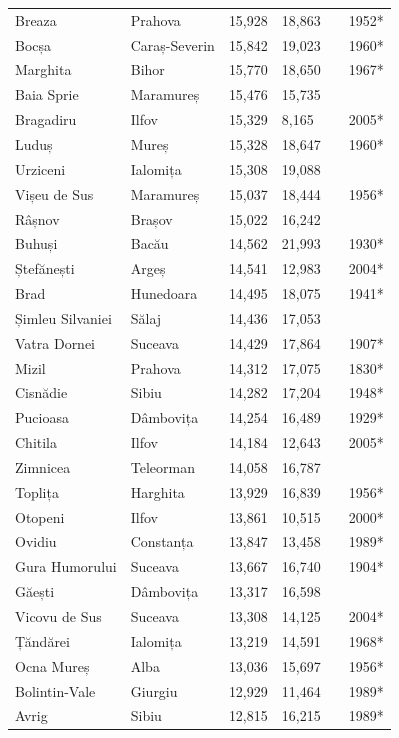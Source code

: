 \documentclass{article}
\begin{document}
\begin{tabular}{llllll}
Breaza & Prahova & 15,928 & 18,863 &  & 1952* \\
Bocșa & Caraș-Severin & 15,842 & 19,023 &  & 1960* \\
Marghita & Bihor & 15,770 & 18,650 &  & 1967* \\
Baia Sprie & Maramureș & 15,476 & 15,735 &  &  \\
Bragadiru & Ilfov & 15,329 & 8,165 &  & 2005* \\
Luduș & Mureș & 15,328 & 18,647 &  & 1960* \\
Urziceni & Ialomița & 15,308 & 19,088 &  &  \\
Vișeu de Sus & Maramureș & 15,037 & 18,444 &  & 1956* \\
Râșnov & Brașov & 15,022 & 16,242 &  &  \\
Buhuși & Bacău & 14,562 & 21,993 &  & 1930* \\
Ștefănești & Argeș & 14,541 & 12,983 &  & 2004* \\
Brad & Hunedoara & 14,495 & 18,075 &  & 1941* \\
Șimleu Silvaniei & Sălaj & 14,436 & 17,053 &  &  \\
Vatra Dornei & Suceava & 14,429 & 17,864 &  & 1907* \\
Mizil & Prahova & 14,312 & 17,075 &  & 1830* \\
Cisnădie & Sibiu & 14,282 & 17,204 &  & 1948* \\
Pucioasa & Dâmbovița & 14,254 & 16,489 &  & 1929* \\
Chitila & Ilfov & 14,184 & 12,643 &  & 2005* \\
Zimnicea & Teleorman & 14,058 & 16,787 &  &  \\
Toplița & Harghita & 13,929 & 16,839 &  & 1956* \\
Otopeni & Ilfov & 13,861 & 10,515 &  & 2000* \\
Ovidiu & Constanța & 13,847 & 13,458 &  & 1989* \\
Gura Humorului & Suceava & 13,667 & 16,740 &  & 1904* \\
Găești & Dâmbovița & 13,317 & 16,598 &  &  \\
Vicovu de Sus & Suceava & 13,308 & 14,125 &  & 2004* \\
Țăndărei & Ialomița & 13,219 & 14,591 &  & 1968* \\
Ocna Mureș & Alba & 13,036 & 15,697 &  & 1956* \\
Bolintin-Vale & Giurgiu & 12,929 & 11,464 &  & 1989* \\
Avrig & Sibiu & 12,815 & 16,215 &  & 1989* \\

\end{tabular}
\end{document}
